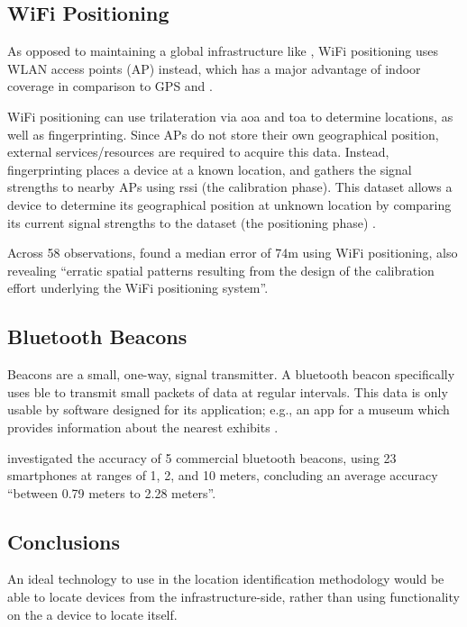 \subsection{WiFi Positioning}

As opposed to maintaining a global infrastructure like
, WiFi positioning uses WLAN access
points (AP) instead, which has a major advantage of indoor
coverage in comparison to GPS and
\parencite{locationComparison}.

WiFi positioning can use \gls{trilateration} via \gls{aoa}
and \gls{toa} to determine locations, as well as
fingerprinting.
Since APs do not store their own geographical position,
external services/resources are required to acquire this
data.
Instead, fingerprinting places a device at a known
location, and gathers the signal strengths to nearby APs
using \gls{rssi} (the calibration phase).
This dataset allows a device to determine its geographical
position at unknown location by comparing its current
signal strengths to the dataset (the positioning phase)
\parencite{locationComparison}.

Across 58 observations, \cite{locationComparison} found a
median error of 74m using WiFi positioning, also revealing
\enquote{erratic spatial patterns resulting from the design
  of the calibration effort underlying the WiFi positioning
  system}.

\subsection{Bluetooth Beacons}

Beacons are a small, one-way, signal transmitter.
A bluetooth beacon specifically uses \gls{ble} to transmit
small packets of data at regular intervals.
This data is only usable by software designed for its
application; e.g., an app for a museum which provides
information about the nearest exhibits
\parencite{usingBluetoothBeacons}.

\cite{bluetoothBeaconAccuracy} investigated the accuracy of
5 commercial bluetooth beacons, using 23 smartphones at
ranges of 1, 2, and 10 meters, concluding an average
accuracy \enquote{between 0.79 meters to 2.28 meters}.

\subsection{Conclusions}

An ideal technology to use in the location identification
methodology would be able to locate devices from the
infrastructure-side, rather than using functionality on the
a device to locate itself.

